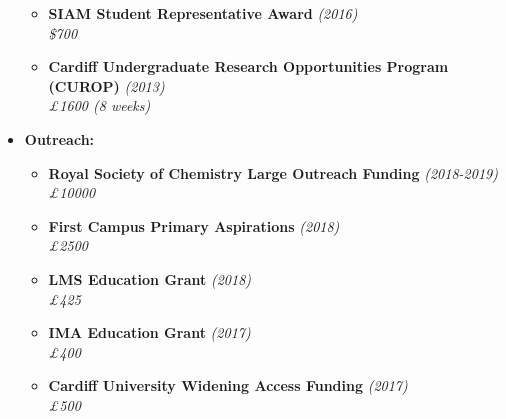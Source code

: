 \documentclass[10pt,a4paper,sans]{moderncv}        %
\begin{document}
\begin{itemize}
\begin{itemize}
				\item \textbf{SIAM Student Representative Award} \hfill \textit{(2016)}\\
				\textit{\$700}
				
				\vspace{2pt}
				
				\item \textbf{Cardiff Undergraduate Research Opportunities Program (CUROP)} \hfill\textit{(2013)} \\
				\textit{£1600 (8 weeks)}
				
			\end{itemize}
			
			\vspace{6pt}
			
			\item \textbf{Outreach:}
				
			\vspace{6pt}
			
			\begin{itemize}
				
				\item \textbf{Royal Society of Chemistry Large Outreach Funding} \hfill\textit{(2018-2019)}\\
				\textit{£10000}
				
				\vspace{2pt}
				
				\item \textbf{First Campus Primary Aspirations} \hfill\textit{(2018)}\\
				\textit{£2500}
				
				\vspace{2pt}
				
				\item \textbf{LMS Education Grant} \hfill\textit{(2018)}\\
				\textit{£425}

				\vspace{2pt}
				
				\item \textbf{IMA Education Grant} \hfill\textit{(2017)}\\
				\textit{£400}
				
				\vspace{2pt}
				
				\item \textbf{Cardiff University Widening Access Funding} \hfill\textit{(2017)}\\
				\textit{£500}
				
			\end{itemize}
				
		
		\end{itemize}
	
\end{document}
